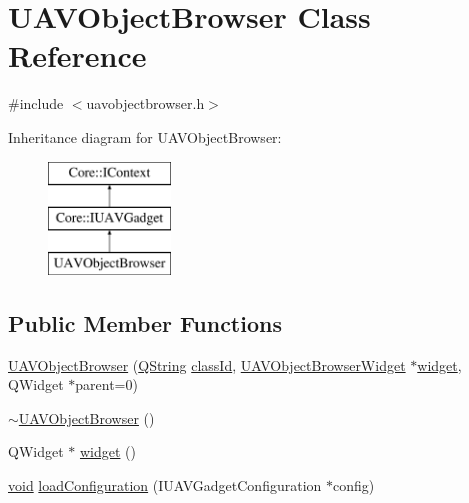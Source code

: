 \hypertarget{class_u_a_v_object_browser}{\section{\-U\-A\-V\-Object\-Browser \-Class \-Reference}
\label{class_u_a_v_object_browser}
}


{\ttfamily \#include $<$uavobjectbrowser.\-h$>$}

\-Inheritance diagram for \-U\-A\-V\-Object\-Browser\-:\begin{figure}[H]
\begin{center}
\leavevmode
\includegraphics[height=3.000000cm]{class_u_a_v_object_browser}
\end{center}
\end{figure}
\subsection*{\-Public \-Member \-Functions}
\begin{DoxyCompactItemize}
\item 
\hyperlink{group___u_a_v_object_browser_plugin_ga9723050126ebdcc8952f6190cf8f7dbf}{\-U\-A\-V\-Object\-Browser} (\hyperlink{group___u_a_v_objects_plugin_gab9d252f49c333c94a72f97ce3105a32d}{\-Q\-String} \hyperlink{group___core_plugin_ga3878fde66a57220608960bcc3fbeef2c}{class\-Id}, \hyperlink{class_u_a_v_object_browser_widget}{\-U\-A\-V\-Object\-Browser\-Widget} $\ast$\hyperlink{group___u_a_v_object_browser_plugin_ga8ed7f7a3fa9ad46c595ee27903636dfe}{widget}, \-Q\-Widget $\ast$parent=0)
\item 
\hyperlink{group___u_a_v_object_browser_plugin_gacacc07d4e73a9da5c6faee7763dde1b4}{$\sim$\-U\-A\-V\-Object\-Browser} ()
\item 
\-Q\-Widget $\ast$ \hyperlink{group___u_a_v_object_browser_plugin_ga8ed7f7a3fa9ad46c595ee27903636dfe}{widget} ()
\item 
\hyperlink{group___u_a_v_objects_plugin_ga444cf2ff3f0ecbe028adce838d373f5c}{void} \hyperlink{group___u_a_v_object_browser_plugin_gaf13947eb936ed7bb3d885d099fcc5ca2}{load\-Configuration} (\-I\-U\-A\-V\-Gadget\-Configuration $\ast$config)
\end{DoxyCompactItemize}


